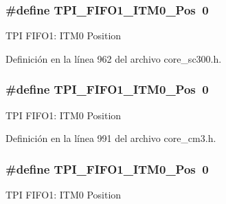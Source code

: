 \subsubsection[{\texorpdfstring{T\+P\+I\+\_\+\+F\+I\+F\+O1\+\_\+\+I\+T\+M0\+\_\+\+Pos}{TPI_FIFO1_ITM0_Pos}}]{\setlength{\rightskip}{0pt plus 5cm}\#define T\+P\+I\+\_\+\+F\+I\+F\+O1\+\_\+\+I\+T\+M0\+\_\+\+Pos~0}\hypertarget{group___c_m_s_i_s___t_p_i_ga2188671488417a52abb075bcd4d73440}{}\label{group___c_m_s_i_s___t_p_i_ga2188671488417a52abb075bcd4d73440}
T\+PI F\+I\+F\+O1\+: I\+T\+M0 Position 

Definición en la línea 962 del archivo core\+\_\+sc300.\+h.

\subsubsection[{\texorpdfstring{T\+P\+I\+\_\+\+F\+I\+F\+O1\+\_\+\+I\+T\+M0\+\_\+\+Pos}{TPI_FIFO1_ITM0_Pos}}]{\setlength{\rightskip}{0pt plus 5cm}\#define T\+P\+I\+\_\+\+F\+I\+F\+O1\+\_\+\+I\+T\+M0\+\_\+\+Pos~0}\hypertarget{group___c_m_s_i_s___t_p_i_ga2188671488417a52abb075bcd4d73440}{}\label{group___c_m_s_i_s___t_p_i_ga2188671488417a52abb075bcd4d73440}
T\+PI F\+I\+F\+O1\+: I\+T\+M0 Position 

Definición en la línea 991 del archivo core\+\_\+cm3.\+h.

\subsubsection[{\texorpdfstring{T\+P\+I\+\_\+\+F\+I\+F\+O1\+\_\+\+I\+T\+M0\+\_\+\+Pos}{TPI_FIFO1_ITM0_Pos}}]{\setlength{\rightskip}{0pt plus 5cm}\#define T\+P\+I\+\_\+\+F\+I\+F\+O1\+\_\+\+I\+T\+M0\+\_\+\+Pos~0}\hypertarget{group___c_m_s_i_s___t_p_i_ga2188671488417a52abb075bcd4d73440}{}\label{group___c_m_s_i_s___t_p_i_ga2188671488417a52abb075bcd4d73440}
T\+PI F\+I\+F\+O1\+: I\+T\+M0 Position 

